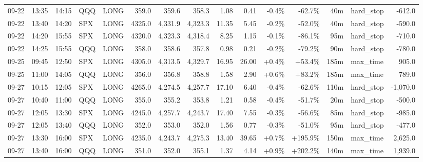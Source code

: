 \documentclass[11pt,a4paper,twoside]{article}
\begin{document}
\begin{landscape}
\begin{center}
\begin{longtable}{>{\color{txtmain}}l l l l l r r r r r r r r >{\color{txtmain}}l r}
09-22 & 13:35 & 14:15 & QQQ & LONG & 359.0 & 359.6 & 358.3 & 1.08 & 0.41 & \textcolor{lossred}{-0.4\%} & \textcolor{lossred}{-62.7\%} & 40m & hard\_stop & \textcolor{lossred}{-612.0} \\
09-22 & 13:40 & 14:20 & SPX & LONG & 4325.0 & 4,331.9 & 4,323.3 & 11.35 & 5.45 & \textcolor{lossred}{-0.2\%} & \textcolor{lossred}{-52.0\%} & 40m & hard\_stop & \textcolor{lossred}{-590.0} \\
09-22 & 14:20 & 15:55 & SPX & LONG & 4320.0 & 4,323.3 & 4,318.4 & 8.25 & 1.15 & \textcolor{lossred}{-0.1\%} & \textcolor{lossred}{-86.1\%} & 95m & hard\_stop & \textcolor{lossred}{-710.0} \\
09-22 & 14:25 & 15:55 & QQQ & LONG & 358.0 & 358.6 & 357.8 & 0.98 & 0.21 & \textcolor{lossred}{-0.2\%} & \textcolor{lossred}{-79.2\%} & 90m & hard\_stop & \textcolor{lossred}{-780.0} \\
09-25 & 09:45 & 12:50 & SPX & LONG & 4305.0 & 4,313.5 & 4,329.7 & 16.95 & 26.00 & \textcolor{wingreen}{+0.4\%} & \textcolor{wingreen}{+53.4\%} & 185m & max\_time & \textcolor{wingreen}{905.0} \\
09-25 & 11:00 & 14:05 & QQQ & LONG & 356.0 & 356.8 & 358.8 & 1.58 & 2.90 & \textcolor{wingreen}{+0.6\%} & \textcolor{wingreen}{+83.2\%} & 185m & max\_time & \textcolor{wingreen}{789.0} \\
09-27 & 10:15 & 12:05 & SPX & LONG & 4265.0 & 4,274.5 & 4,257.7 & 17.10 & 6.40 & \textcolor{lossred}{-0.4\%} & \textcolor{lossred}{-62.6\%} & 110m & hard\_stop & \textcolor{lossred}{-1,070.0} \\
09-27 & 10:40 & 11:00 & QQQ & LONG & 355.0 & 355.2 & 353.8 & 1.21 & 0.58 & \textcolor{lossred}{-0.4\%} & \textcolor{lossred}{-51.7\%} & 20m & hard\_stop & \textcolor{lossred}{-500.0} \\
09-27 & 12:05 & 13:30 & SPX & LONG & 4245.0 & 4,257.7 & 4,243.7 & 17.40 & 7.55 & \textcolor{lossred}{-0.3\%} & \textcolor{lossred}{-56.6\%} & 85m & hard\_stop & \textcolor{lossred}{-985.0} \\
09-27 & 12:05 & 13:40 & QQQ & LONG & 352.0 & 353.0 & 352.0 & 1.56 & 0.77 & \textcolor{lossred}{-0.3\%} & \textcolor{lossred}{-51.0\%} & 95m & hard\_stop & \textcolor{lossred}{-477.0} \\
09-27 & 13:30 & 16:00 & SPX & LONG & 4235.0 & 4,243.7 & 4,275.3 & 13.40 & 39.65 & \textcolor{wingreen}{+0.7\%} & \textcolor{wingreen}{+195.9\%} & 150m & max\_time & \textcolor{wingreen}{2,625.0} \\
09-27 & 13:40 & 16:00 & QQQ & LONG & 351.0 & 352.0 & 355.1 & 1.37 & 4.14 & \textcolor{wingreen}{+0.9\%} & \textcolor{wingreen}{+202.2\%} & 140m & max\_time & \textcolor{wingreen}{1,939.0} \\

\end{longtable}
\end{center}
\end{landscape}
\end{document}
